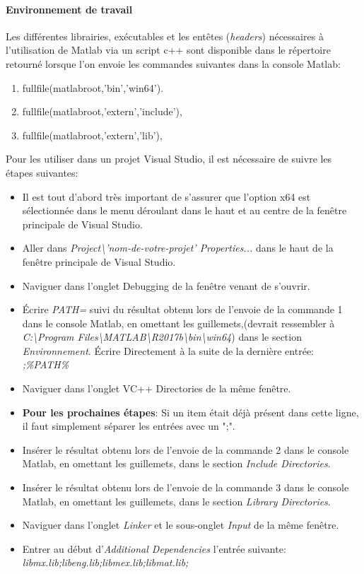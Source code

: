 \documentclass[root.tex]{subfiles}
\begin{document}
\paragraph{Environnement de travail} Les différentes librairies, exécutables et les entêtes (\textit{headers})  nécessaires à l'utilisation de Matlab via un script c++ sont disponible dans le répertoire retourné lorsque l'on envoie les commandes suivantes dans la console Matlab:
\begin{enumerate}
\item fullfile(matlabroot,'bin','win64').
\item fullfile(matlabroot,'extern','include'),
\item fullfile(matlabroot,'extern','lib'),
\end{enumerate}

Pour les utiliser dans un projet Visual Studio, il est nécessaire de suivre les étapes suivantes:
\begin{itemize}
\item Il est tout d'abord très important de s'assurer que l'option x64 est sélectionnée dans le menu déroulant dans le haut et au centre de la fenêtre principale de Visual Studio.
\item Aller dans \textit{Project\textbackslash'nom-de-votre-projet' Properties...} dans le haut de la fenêtre principale de Visual Studio.
\item Naviguer dans l'onglet Debugging de la fenêtre venant de s'ouvrir.
\item Écrire \textit{PATH=} suivi du résultat obtenu lors de l'envoie de la commande 1 dans le console Matlab, en omettant les guillemets,(devrait ressembler à \newline \textit{C:\textbackslash Program Files\textbackslash MATLAB\textbackslash R2017b\textbackslash bin\textbackslash win64}) dans le section \textit{Environnement}.
Écrire Directement à la suite de la dernière entrée: \textit{;\%PATH\%}
\item Naviguer dans l'onglet VC++ Directories de la même fenêtre.
\item \textbf{Pour les prochaines étapes}: Si un item était déjà présent dans cette ligne, il faut simplement séparer les entrées avec un ";".
\item Insérer le résultat obtenu lors de l'envoie de la commande 2 dans le console Matlab, en omettant les guillemets, dans le section \textit{Include Directories}.
\item Insérer le résultat obtenu lors de l'envoie de la commande 3 dans le console Matlab, en omettant les guillemets, dans le section \textit{Library Directories}.
\item Naviguer dans l'onglet \textit{Linker} et le sous-onglet \textit{Input} de la même fenêtre.
\item Entrer au début d'\textit{Additional Dependencies} l'entrée suivante: \textit{libmx.lib;libeng.lib;libmex.lib;libmat.lib;}
\end{itemize}
\end{document}

